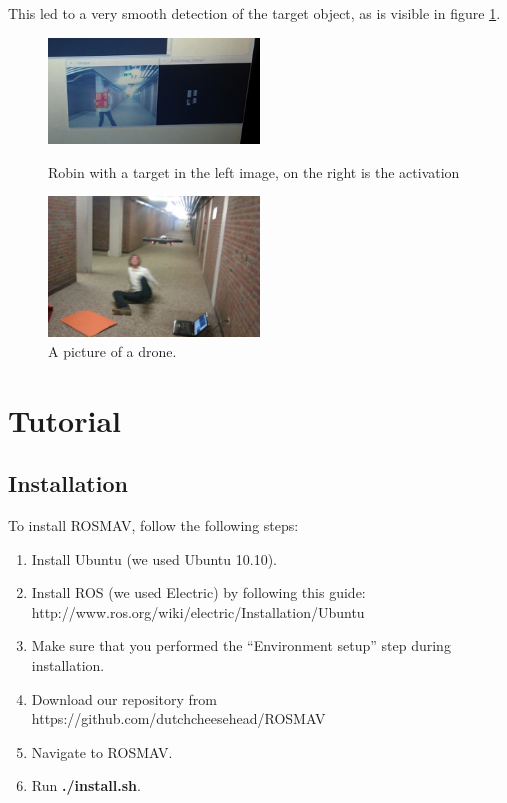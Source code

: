 \documentclass[a4paper,10pt]{article}
\begin{document}
This led to a very smooth detection of the target object, as is visible in figure \ref{fig:robinPresentActivation}. 

\begin{figure}[h!]
	\caption{Robin with a target in the left image, on the right is the activation}
	\centering
	\includegraphics[width=0.5\textwidth]{images/robinPresentActivation}
	\label{fig:robinPresentActivation}
\end{figure}

\begin{figure}[h!]
	\caption{A picture of a drone.}
	\centering
	\includegraphics[width=0.5\textwidth]{images/droneAttack}
\end{figure}

\section{Tutorial}
\subsection{Installation}
To install ROSMAV, follow the following steps:
\begin{enumerate}
\item Install Ubuntu (we used Ubuntu 10.10).

\item Install ROS (we used Electric) by following this guide: \\
      http://www.ros.org/wiki/electric/Installation/Ubuntu

\item Make sure that you performed the ``Environment setup'' step during installation.

\item Download our repository from
      https://github.com/dutchcheesehead/ROSMAV

\item Navigate to ROSMAV.

\item Run \textbf{./install.sh}.
\end{enumerate}
\end{document}
